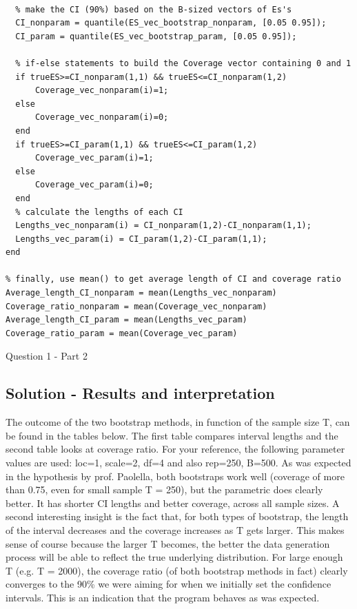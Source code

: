 \documentclass[12pt]{article}
\begin{document}
\begin{Program}[!htb]
\begin{lstlisting}[style=Matlab-editor,basicstyle=\mlttfamily\footnotesize]
% Continuance of Question 1 ----------------------------------------------

  % make the CI (90%) based on the B-sized vectors of Es's
  CI_nonparam = quantile(ES_vec_bootstrap_nonparam, [0.05 0.95]);
  CI_param = quantile(ES_vec_bootstrap_param, [0.05 0.95]); 
 
  % if-else statements to build the Coverage vector containing 0 and 1
  if trueES>=CI_nonparam(1,1) && trueES<=CI_nonparam(1,2) 
      Coverage_vec_nonparam(i)=1;
  else
      Coverage_vec_nonparam(i)=0;
  end
  if trueES>=CI_param(1,1) && trueES<=CI_param(1,2) 
      Coverage_vec_param(i)=1;
  else
      Coverage_vec_param(i)=0;
  end
  % calculate the lengths of each CI
  Lengths_vec_nonparam(i) = CI_nonparam(1,2)-CI_nonparam(1,1);
  Lengths_vec_param(i) = CI_param(1,2)-CI_param(1,1);
end

% finally, use mean() to get average length of CI and coverage ratio
Average_length_CI_nonparam = mean(Lengths_vec_nonparam)
Coverage_ratio_nonparam = mean(Coverage_vec_nonparam)
Average_length_CI_param = mean(Lengths_vec_param)
Coverage_ratio_param = mean(Coverage_vec_param)

\end{lstlisting}
\caption{Question 1 - Part 2}
\label{Question 1 - Part 2}
\end{Program}

\newpage

\subsection*{Solution - Results and interpretation}
The outcome of the two bootstrap methods, in function of the sample size T, can be found in the tables below. The first table compares interval lengths and the second table looks at coverage ratio. For your reference, the following parameter values are used: loc=1, scale=2, df=4 and also rep=250, B=500.
\newline \newline
As was expected in the hypothesis by prof. Paolella, both bootstraps work well (coverage of more than 0.75, even for small sample T = 250), but the parametric does clearly better. It has shorter CI lengths and better coverage, across all sample sizes. \newline A second interesting insight is the fact that, for both types of bootstrap, the length of the interval decreases and the coverage increases as T gets larger. This makes sense of course because the larger T becomes, the better the data generation process will be able to reflect the true underlying distribution. For large enough T (e.g. T = 2000), the coverage ratio (of both bootstrap methods in fact) clearly converges to the  90\% we were aiming for when we initially set the confidence intervals. This is an indication that the program behaves as was expected.\newline 
\end{document}
